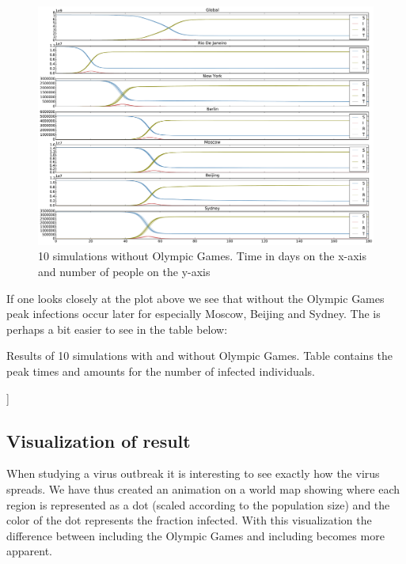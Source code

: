 \begin{figure}[H]
	\centering
	\includegraphics[width=1.0 \linewidth]{plots/no_rio.pdf}
	\caption{10 simulations without Olympic Games. Time in days on the x-axis and number of people on the y-axis}
\end{figure}

If one looks closely at the plot above we see that without the Olympic Games peak infections occur later for especially Moscow, Beijing and Sydney. The is perhaps a bit easier to see in the table below:

\begin{table}[H]
	\centering
	
	\caption{Results of 10 simulations with and without Olympic Games. Table contains the peak times and amounts for the number of infected individuals.}
\end{table}]


\subsection{Visualization of result}
When studying a virus outbreak it is interesting to see exactly how the virus spreads. We have thus created an animation on a world map showing where each region is represented as a dot (scaled according to the population size) and the color of the dot represents the fraction infected. With this visualization the difference between including the Olympic Games and including becomes more apparent.

